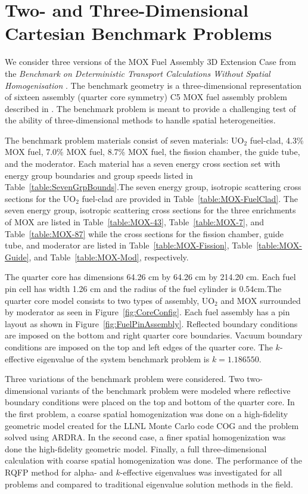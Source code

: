 \clearpage

\section{Two- and Three-Dimensional Cartesian Benchmark Problems}

We consider three versions of the MOX Fuel Assembly 3D Extension Case from the \textit{Benchmark on Deterministic Transport Calculations Without Spatial Homogenisation} \cite{lewis2001benchmark}. The benchmark geometry is a three-dimensional representation of sixteen assembly (quarter core symmetry) C5 MOX fuel assembly problem described in \cite{cavarec1994oecd}. The benchmark problem is meant to provide a challenging test of the ability of three-dimensional methods to handle spatial heterogeneities. 

The benchmark problem materials consist of seven materials: UO$_{2}$ fuel-clad, 4.3\% MOX fuel, 7.0\% MOX fuel, 8.7\% MOX fuel, the fission chamber, the guide tube, and the moderator. Each material has a seven energy cross section set with energy group boundaries and group speeds listed in Table~\ref{table:SevenGrpBounds}.The seven energy group, isotropic scattering cross sections for the UO$_{2}$ fuel-clad are provided in Table~\ref{table:MOX-FuelClad}. The seven energy group, isotropic scattering cross sections for the three enrichments of MOX are listed in Table~\ref{table:MOX-43}, Table~\ref{table:MOX-7}, and Table~\ref{table:MOX-87} while the cross sections for the fission chamber, guide tube, and moderator are listed in Table~\ref{table:MOX-Fission}, Table~\ref{table:MOX-Guide}, and Table~\ref{table:MOX-Mod}, respectively.

The quarter core has dimensions 64.26 cm by 64.26 cm by 214.20 cm. Each fuel pin cell has width 1.26 cm and the radius of the fuel cylinder is 0.54cm.The quarter core model consists to two types of assembly, UO$_{2}$ and MOX surrounded by moderator as seen in Figure~\ref{fig:CoreConfig}. Each fuel assembly has a pin layout as shown in Figure~\ref{fig:FuelPinAssembly}. Reflected boundary conditions are imposed on the bottom and right quarter core boundaries. Vacuum boundary conditions are imposed on the top and left edges of the quarter core. The $k$-effective eigenvalue of the system benchmark problem is $k = 1.186550$.

Three variations of the benchmark problem were considered. Two two-dimensional variants of the benchmark problem were modeled where reflective boundary conditions were placed on the top and bottom of the quarter core. In the first problem, a coarse spatial homogenization was done on a high-fidelity geometric model created for the LLNL Monte Carlo code COG \cite{buck1993cog} and the problem solved using ARDRA. In the second case, a finer spatial homogenization was done the high-fidelity geometric model. Finally, a full three-dimensional calculation with coarse spatial homogenization was done. The performance of the RQFP method for alpha- and $k$-effective eigenvalues was investigated for all problems and compared to traditional eigenvalue solution methods in the field.

